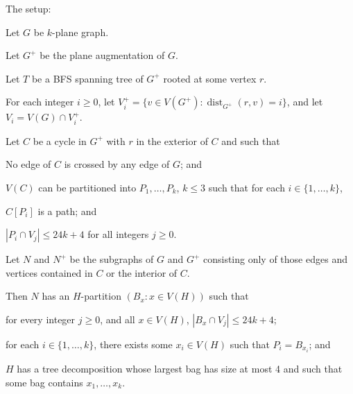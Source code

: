 \documentclass{patmorin}
\DeclareMathOperator{\dist}{dist}
\begin{document}
\begin{lem} The setup:
  \begin{compactenum}
    \item Let $G$ be $k$-plane graph.
    \item Let $G^+$ be the plane augmentation of $G$.
    \item Let $T$ be a BFS spanning tree of $G^+$ rooted at some vertex $r$.
    \item For each integer $i\ge 0$, let $V^+_i=\{v\in V(G^+):\dist_{G^+}(r,v)=i\}$, and let $V_i=V(G)\cap V^+_i$.
    \item Let $C$ be a cycle in $G^+$ with $r$ in the exterior of $C$ and such that
    \begin{compactenum} 
      \item No edge of $C$ is crossed by any edge of $G$; and
      \item $V(C)$ can be partitioned into $P_1,\ldots,P_k$, $k\le 3$ such that for each $i\in\{1,\ldots,k\}$,
      \begin{compactenum}
        \item $C[P_i]$ is a path; and
        \item $|P_i\cap V_j| \le 24k+4$ for all integers $j\ge 0$.
      \end{compactenum}
    \end{compactenum}
    \item Let $N$ and $N^+$ be the subgraphs of $G$ and $G^+$ consisting only of those edges and vertices contained in $C$ or the interior of $C$.
  \end{compactenum}
  Then $N$ has an $H$-partition $(B_x : x\in V(H))$ such that
  \begin{compactenum}
    \item for every integer $j\ge 0$, and all $x\in V(H)$, $|B_x\cap V_j|\le 24k+4$; 
    \item for each $i\in\{1,\ldots,k\}$, there exists some $x_i\in V(H)$ such that $P_i=B_{x_i}$; and
    \item $H$ has a tree decomposition whose largest bag has size at most 4 and such that some bag contains $x_1,\ldots,x_k$.
  \end{compactenum}
\end{lem}
\end{document}
